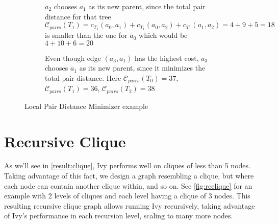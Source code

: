 \documentclass[a4paper, oneside]{discothesis}
\begin{document}
\begin{figure}[H]
\begin{subfigure}[t]{0.5\textwidth}
\centering
{}
\caption{$a_{2}$ chooses $a_{1}$ as its new parent, since the total pair distance for that tree $\mathcal{C}_{pairs}(T_1)=c_{T_1}(a_{0},a_{1})+c_{T_1}(a_{0},a_{2})+c_{T_1}(a_{1},a_{2})=4+9+5=18$ is smaller than the one for $a_{0}$ which would be $4+10+6=20$}
\end{subfigure}
\quad
\begin{subfigure}[t]{0.5\textwidth}
\centering
{}
\caption{Even though edge $(a_{3},a_{1})$ has the highest cost, $a_{3}$ chooses $a_{1}$ as its new parent, since it minimizes the total pair distance. Here $\mathcal{C}_{pairs}(T_0)=37$, $\mathcal{C}_{pairs}(T_1)=36$, $\mathcal{C}_{pairs}(T_2)=38$}
\end{subfigure}
\caption{Local Pair Distance Minimizer example}
\label{fig:lpm}
\end{figure}

\section{Recursive Clique}
\label{alg:reclique}

As we'll see in \autoref{result:clique}, Ivy performs well on cliques of less than 5 nodes. 
Taking advantage of this fact, we design a graph resembling a clique, but where each node can contain another clique within, and so on. See \autoref{fig:reclique} for an example with 2 levels of cliques and each level having a clique of 3 nodes. This resulting recursive clique graph allows running Ivy recursively, taking advantage of Ivy's performance in each recursion level, scaling to many more nodes.
\end{document}
